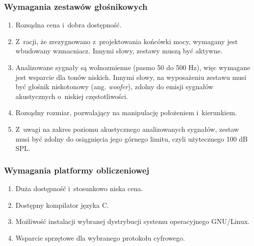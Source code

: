 \subsubsection{Wymagania zestawów głośnikowych}

\begin{enumerate}

        \item Rozsądna cena i~dobra dostępność.

        \item Z~racji, że zrezygnowano z~projektowania końcówki mocy, wymagany
        jest wbudowany wzmacniacz. Innymi słowy, zestawy muszą być aktywne.
    
        \item Analizowane sygnały są wolnozmienne (pasmo 50 do 500 Hz), więc
        wymagane jest wsparcie dla tonów niskich. Innymi słowy, na wyposażeniu
        zestawu musi być głośnik niskotonowy (ang. \textit{woofer}), zdolny do
        emisji sygnałów akustycznych o~niskiej częstotliwości.

        \item Rozsądny rozmiar, pozwalający na manipulację położeniem
        i~kierunkiem.
    
        \item Z~uwagi na zakres poziomu akustycznego analizowanych sygnałów,
        zestaw musi być zdolny do osiągnięcia jego górnego limitu, czyli
        użytecznego 100 dB SPL.

\end{enumerate}

\subsubsection{Wymagania platformy obliczeniowej}

\begin{enumerate}

    \item Duża dostępność i~stosunkowo niska cena.

    \item Dostępny kompilator języka C.

    \item Możliwość instalacji wybranej dystrybucji systemu operacyjnego
    GNU/Linux.

    \item Wsparcie sprzętowe dla wybranego protokołu cyfrowego.

\end{enumerate}

